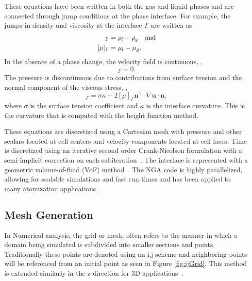 These equations have been written in both the gas and liquid phases and are connected through jump conditions at the phase interface.
For example, the jumps in density and viscosity at the interface
$\Gamma$ are written as 
\begin{align}
[\rho]_\Gamma&%
=\rho_l-\rho_g\mbox{\quad and}\\
[\mu]_\Gamma&%
=\mu_l-\mu_g.
\end{align}
In the absence of a phase change, the velocity field is continuous, \ie,
\begin{equation}
[\bm{u}]_\Gamma=0.
\end{equation}
The pressure is discontinuous due to contributions from surface tension and the normal component of the viscous stress, \ie,
\begin{equation}
[p]_\Gamma=\sigma\kappa+ 2\left[\mu\right]_\Gamma\bm{n}^\mathsf{T}\cdot\nabla\bm{u}\cdot\bm{n},
\end{equation}
where
$\sigma$ is the surface tension coefficient and
$\kappa$ is the interface curvature. This is the curvature that is computed with the height function method.

These equations are discretized using a Cartesian mesh with pressure and other scalars located at cell centers and velocity components located at cell faces. Time is discretized using an iterative second order Crank-Nicolson formulation with a semi-implicit correction on each subiteration~\cite{choi}. The interface is represented with a geometric volume-of-fluid (VoF) method~\cite{Owkes2017,Owkes2014}. The NGA code is highly parallelized, allowing for scalable simulations and fast run times and has been applied to many atomization applications~\cite{OwkesAIAA,Desjardins2013,sheehy}.

\subsection{Mesh Generation}
In Numerical analysis, the grid or mesh, often refers to the manner in which a domain being simulated is subdivided into smaller sections and points. Traditionally these points are denoted using an i,j scheme and neighboring points will be referenced from an initial point as seen in Figure \ref{fig:ijGrid}. This method is extended similarly in the z-direction for 3D applications~\cite{MIT}.  

